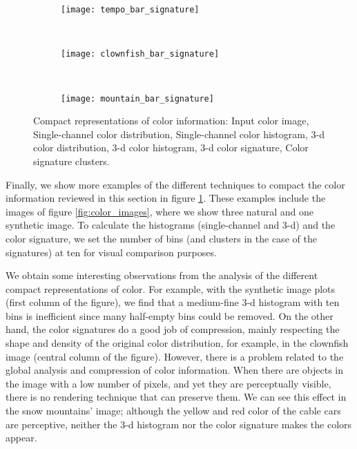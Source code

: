 \begin{figure}[!ht]
    \begin{subfigure}[t]{\textwidth+20pt\relax}
    	\makebox[20pt]{\raisebox{25pt}{}}%
    	\texttt{[image: tempo\_bar\_signature]}
    \end{subfigure}~ 
    \begin{subfigure}[b]{0.32\textwidth}
        \texttt{[image: clownfish\_bar\_signature]}
    \end{subfigure}~
    \begin{subfigure}[b]{0.32\textwidth}
        \texttt{[image: mountain\_bar\_signature]}
    \end{subfigure}
                    
	\caption{Compact representations of color information:  Input color image,  Single-channel color distribution,  Single-channel color histogram,  3-d color distribution,  3-d color histogram,  3-d color signature,  Color signature clusters.}\label{fig:color_image_representations}    
\end{figure}

Finally, we show more examples of the different techniques to compact the color information reviewed in this section in figure \ref{fig:color_image_representations}. These examples include the images of figure \ref{fig:color_images}, where we show three natural and one synthetic image. To calculate the histograms (single-channel and 3-d) and the color signature, we set the number of bins (and clusters in the case of the signatures) at ten for visual comparison purposes.

We obtain some interesting observations from the analysis of the different compact representations of color. For example, with the synthetic image plots (first column of the figure), we find that a medium-fine 3-d histogram with ten bins is inefficient since many half-empty bins could be removed. On the other hand, the color signatures do a good job of compression, mainly respecting the shape and density of the original color distribution, for example, in the clownfish image (central column of the figure). However, there is a problem related to the global analysis and compression of color information. When there are objects in the image with a low number of pixels, and yet they are perceptually visible, there is no rendering technique that can preserve them. We can see this effect in the snow mountains' image; although the yellow and red color of the cable cars are perceptive, neither the 3-d histogram nor the color signature makes the colors appear.

